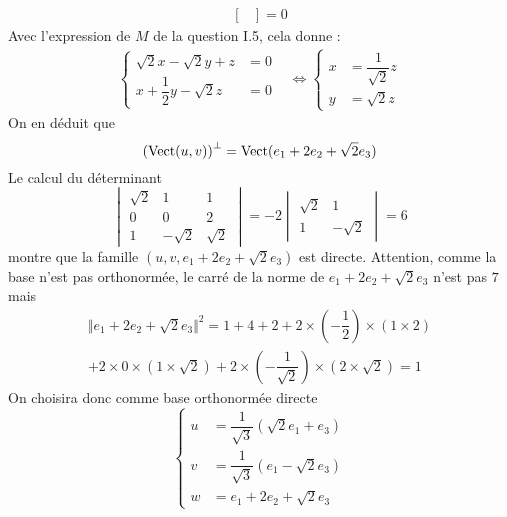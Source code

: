 \begin{enumerate}
\begin{enumerate}
\begin{align*}
\begin{bmatrix}
\end{bmatrix}=0
\end{align*}
Avec l'expression de $M$ de la question I.5, cela donne :
\begin{align*}
 \left\lbrace
\begin{aligned}
 \sqrt{2}x -\sqrt{2}y +z &= 0\\
x+\dfrac{1}{2}y-\sqrt{2}z &=0
\end{aligned}
 \right. 
&\Leftrightarrow
\left\lbrace
\begin{aligned} 
x &= \dfrac{1}{\sqrt2}z \\
y &= \sqrt{2}z
\end{aligned}
\right. 
\end{align*}
On en déduit que 
\begin{displaymath}
 \left( \operatorname{Vect}(u,v)\right)^{\perp}=\operatorname{Vect}(e_1+2e_2+\sqrt{2}e_3) 
\end{displaymath}
Le calcul du déterminant
\begin{displaymath}
 \begin{vmatrix}
  \sqrt{2} & 1 & 1 \\
0 & 0 & 2 \\
1 & -\sqrt{2} & \sqrt{2}
 \end{vmatrix}
=-2
\begin{vmatrix}
 \sqrt{2} & 1 \\
1 & -\sqrt{2}
\end{vmatrix}
= 6
\end{displaymath}
montre que la famille $(u,v,e_1+2e_2+\sqrt{2}e_3)$ est directe.\newline
Attention, comme la base n'est pas orthonormée, le carré de la norme de $e_1+2e_2+\sqrt{2}e_3$ n'est pas $7$ mais
\begin{multline*}
\Vert e_1+2e_2+\sqrt{2}e_3 \Vert^2 = 1 + 4 + 2 + 2\times(-\dfrac{1}{2})\times(1\times 2)\\
 + 2\times 0 \times(1\times\sqrt{2}) + 2\times (-\dfrac{1}{\sqrt{2}})\times(2\times \sqrt{2}) = 1
\end{multline*}
On choisira donc comme  base orthonormée directe 
\begin{displaymath}
 \left\lbrace
\begin{aligned}
 u &= \dfrac{1}{\sqrt{3}}\left(\sqrt{2}e_1 + e_3 \right) \\
v &= \dfrac{1}{\sqrt{3}}\left(e_1 -\sqrt{2} e_3 \right) \\
w &=  e_1+2e_2+\sqrt{2}e_3
\end{aligned}
\right. 
\end{displaymath}



\end{enumerate}
\end{enumerate}
